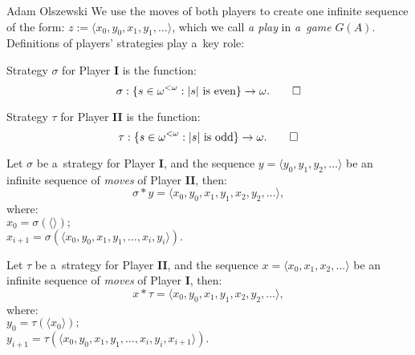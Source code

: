 \begin{artengenv}{Adam Olszewski}
We use the moves of both players to create one infinite sequence of the form: $ z := \langle x_{0}, y_{0}, x_{1}, y_{1}, \ldots \rangle$, which we call \textit{a play} in \textit{a~game} $G(A)$. Definitions of players' strategies play a~key role:
\begingroup\abovedisplayskip=3pt \belowdisplayskip=3pt
\begin{definition}
Strategy $\sigma$ for Player \textbf{I} is the function:
$$\sigma: \{s\in\omega^{<\omega} : |s| \text{ is even}\} \rightarrow \omega.\qedhere$$
\end{definition}
\begin{definition}
Strategy $\tau$ for Player \textbf{II} is the function:
$$\tau: \{s\in\omega^{<\omega} : |s| \text{ is odd}\} \rightarrow \omega.\qedhere$$
\end{definition}
\begin{definition}
Let $\sigma$ be a~strategy for Player \textbf{I}, and the sequence $y = \langle y_{0}, y_{1}, y_{2}, \ldots \rangle$ be an infinite sequence of \textit{moves} of Player \textbf{II}, then:
$$\sigma*y = \langle x_{0}, y_{0}, x_{1}, y_{1}, x_{2}, y_{2}, \ldots \rangle,$$
where:\\
$x_{0} = \sigma({\langle}{\rangle});$\\
$x_{i+1} = \sigma(\langle x_{0}, y_{0}, x_{1}, y_{1}, \ldots, x_{i}, y_{i} \rangle).$
\end{definition}
\begin{definition}
Let $\tau$ be a~strategy for Player \textbf{II}, and the sequence $x = \langle x_{0}, x_{1}, x_{2}, \ldots \rangle$ be an infinite sequence of \textit{moves} of Player \textbf{I}, then:
$$x*\tau = \langle x_{0}, y_{0}, x_{1}, y_{1}, x_{2}, y_{2}, \ldots \rangle,$$
where:\\
$y_{0} = \tau(\langle x_{0} \rangle);$\\
$y_{i+1} = \tau(\langle x_{0}, y_{0}, x_{1}, y_{1}, \ldots, x_{i}, y_{i}, x_{i+1} \rangle).$
\end{definition}
\endgroup


\end{artengenv}
